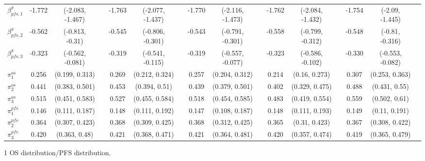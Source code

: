 \documentclass[AMA,STIX1COL]{WileyNJD-v2}
\begin{document}
\begin{landscape}
\begin{center}
\begin{table}[t]
\begin{tabular}{l c c c c c c c c c c c c c c c}
$\beta^{\pi}_{pfs, 1}$ & -1.772 & (-2.083, -1.467) &  & -1.763 & (-2.077, -1.437) &  & -1.770 & (-2.116, -1.473) &  & -1.762 & (-2.084, -1.432) &  & -1.754 & (-2.09, -1.445) & \\
$\beta^{\pi}_{pfs, 2}$ & -0.562 & (-0.813, -0.31) &  & -0.545 & (-0.806, -0.301) &  & -0.543 & (-0.791, -0.301) &  & -0.558 & (-0.799, -0.312) &  & -0.548 & (-0.81, -0.316) & \\
$\beta^{\pi}_{pfs, 3}$ & -0.323 & (-0.562, -0.081) &  & -0.319 & (-0.541, -0.115) &  & -0.319 & (-0.557, -0.077) &  & -0.323 & (-0.586, -0.102) &  & -0.330 & (-0.553, -0.082) & \\
$\pi^{os}_1$ & 0.256 & (0.199, 0.313) &  & 0.269 & (0.212, 0.324) &  & 0.257 & (0.204, 0.312) &  & 0.214 & (0.16, 0.273) &  & 0.307 & (0.253, 0.363) & \\
$\pi^{os}_2$ & 0.441 & (0.383, 0.501) &  & 0.453 & (0.394, 0.51) &  & 0.439 & (0.379, 0.501) &  & 0.402 & (0.329, 0.475) &  & 0.488 & (0.431, 0.55) & \\
$\pi^{os}_3$ & 0.515 & (0.451, 0.583) &  & 0.527 & (0.455, 0.584) &  & 0.518 & (0.454, 0.585) &  & 0.483 & (0.419, 0.554) &  & 0.559 & (0.502, 0.61) & \\
$\pi^{pfs}_1$ & 0.146 & (0.111, 0.187) &  & 0.148 & (0.111, 0.192) &  & 0.147 & (0.108, 0.187) &  & 0.148 & (0.111, 0.193) &  & 0.149 & (0.11, 0.191) & \\
$\pi^{pfs}_2$ & 0.364 & (0.307, 0.423) &  & 0.368 & (0.309, 0.425) &  & 0.368 & (0.312, 0.425) &  & 0.365 & (0.31, 0.423) &  & 0.367 & (0.308, 0.422) & \\
$\pi^{pfs}_3$ & 0.420 & (0.363, 0.48) &  & 0.421 & (0.368, 0.471) &  & 0.421 & (0.364, 0.481) &  & 0.420 & (0.357, 0.474) &  & 0.419 & (0.365, 0.479) & \\
\bottomrule
\end{tabular}
\begin{tablenotes}%
\item[1] OS distribution/PFS distribution.
\end{tablenotes}
\end{table}
\end{center}
\end{landscape}
\end{document}
